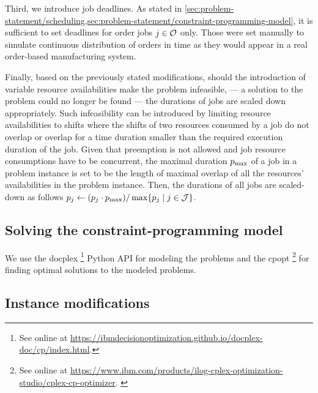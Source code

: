 Third, we introduce job deadlines.
As stated in \cref{sec:problem-statement/scheduling,sec:problem-statement/constraint-programming-model},
it is sufficient to set deadlines for order jobs $j \in \mathcal{O}$ only.
Those were set manually to simulate continuous distribution of orders in time
as they would appear in a real order-based manufacturing system.

Finally, based on the previously stated modifications,
should the introduction of variable resource availabilities make the problem infeasible,
--- a solution to the problem could no longer be found ---
the durations of jobs are scaled down appropriately.
Such infeasibility can be introduced by limiting resource availabilities to shifts
where the shifts of two resources consumed by a job do not overlap
or overlap for a time duration smaller than the required execution duration of the job.
Given that preemption is not allowed and job resource consumptions have to be concurrent,
the maximal duration $p_{\text{max}}$ of a job in a problem instance is set to be the length of maximal overlap
of all the resources' availabilities in the problem instance.
Then, the durations of all jobs are scaled-down as follows
$p_{j} \gets (p_{j} \cdot p_{\text{max}}) / \max\{p_{j} \;|\; j \in \mathcal{J} \}$.


\subsection{Solving the constraint-programming model} \label{subsec:numerical-experiments/setup/solving-cp-model}

We use the \ac{docplex}%
\footnote{See online at \url{https://ibmdecisionoptimization.github.io/docplex-doc/cp/index.html}.}
Python API for modeling the problems
and the \ac{cpopt}%
\footnote{See online at \url{https://www.ibm.com/products/ilog-cplex-optimization-studio/cplex-cp-optimizer}. \citep{WEB_IBM_CPLEX}}
for finding optimal solutions to the modeled problems.


\subsection{Instance modifications} \label{subsec:numerical-experiments/setup/instance-modifications}

